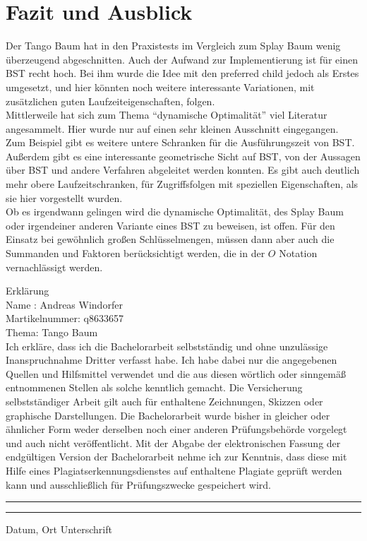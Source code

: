 \documentclass[a4paper,12pt]{article}
\begin{document}
\section{Fazit und Ausblick}
Der Tango Baum hat in den Praxistests im Vergleich zum Splay Baum wenig überzeugend abgeschnitten. Auch der Aufwand zur Implementierung ist für einen BST recht hoch. Bei ihm wurde die Idee mit den preferred child jedoch als Erstes umgesetzt, und hier könnten noch weitere interessante Variationen, mit zusätzlichen guten Laufzeiteigenschaften, folgen. \\
Mittlerweile hat sich zum Thema \enquote{dynamische Optimalität} viel Literatur angesammelt. Hier wurde nur auf einen sehr kleinen Ausschnitt eingegangen. Zum Beispiel gibt es  weitere untere Schranken für die Ausführungszeit von BST. Außerdem gibt es eine interessante geometrische Sicht auf BST, von der Aussagen über BST und andere Verfahren abgeleitet werden konnten. Es gibt auch deutlich mehr obere Laufzeitschranken, für Zugriffsfolgen mit speziellen Eigenschaften, als sie hier vorgestellt wurden. \\
Ob es irgendwann gelingen wird die dynamische Optimalität, des Splay Baum oder irgendeiner anderen Variante eines BST zu beweisen, ist offen. Für den Einsatz bei gewöhnlich großen Schlüsselmengen, müssen dann aber auch die Summanden und Faktoren berücksichtigt werden, die in der $O$ Notation vernachlässigt werden.


\newpage
\listoffigures
\newpage
\Large
\noindent Erklärung\bigskip\\
\normalsize
\noindent Name : Andreas Windorfer\\
Martikelnummer: q8633657\\
Thema: Tango Baum \bigskip\\


\noindent Ich erkläre, dass ich die Bachelorarbeit selbstständig und ohne unzulässige Inanspruchnahme Dritter verfasst habe. Ich habe dabei nur die angegebenen Quellen und Hilfsmittel verwendet und die aus diesen wörtlich oder sinngemäß entnommenen Stellen als solche kenntlich gemacht. Die Versicherung selbstständiger Arbeit gilt auch für enthaltene Zeichnungen, Skizzen oder graphische Darstellungen. Die Bachelorarbeit wurde bisher in gleicher oder ähnlicher Form weder derselben noch einer anderen Prüfungsbehörde vorgelegt und auch nicht veröffentlicht. Mit der Abgabe der elektronischen Fassung der endgültigen Version der Bachelorarbeit nehme ich zur Kenntnis, dass diese mit Hilfe eines Plagiatserkennungsdienstes auf enthaltene Plagiate geprüft werden kann und ausschließlich für Prüfungszwecke gespeichert wird.\\

\vspace{50pt}
\noindent\rule{5cm}{.4pt}\hfill\rule{5cm}{.4pt}\par
\noindent Datum, Ort \hfill Unterschrift
                       



\newpage


\end{document}
